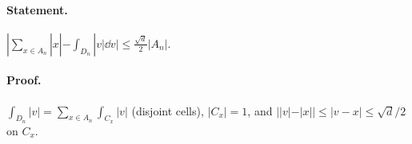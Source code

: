 \paragraph{Statement.} $|\sum_{x\in A_n}|x|-\int_{D_n}|v|\dd v|\leq\frac{\sqrt d}2|A_n|$.
\paragraph{Proof.} $\int_{D_n}|v|=\sum_{x\in A_n}\int_{C_x}|v|$ (disjoint cells), $|C_x|=1$, and $||v|-|x||\leq|v-x|\leq\sqrt d/2$ on $C_x$.
